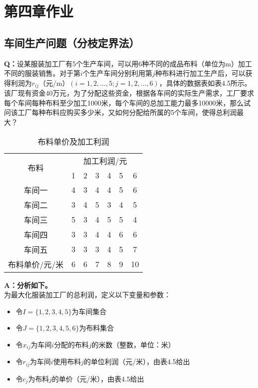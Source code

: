\ifx\allfiles\undefined

    
    
\else
\fi
\section{第四章作业}
\subsection{车间生产问题（分枝定界法）}
\textbf{Q：}设某服装加工厂有5个生产车间，可以用6种不同的成品布料（单位为m）加工不同的服装销售。对于第$i$个生产车间分别利用第$j$种布料进行加工生产后，可以获得利润为$r_{ij}$（元/m）$(i=1,2,...,5; j=1,2,...,6)$，具体的数据表如表4.5所示。\\
该厂现有资金40万元，为了分配这些资金，根据各车间的实际生产需求，工厂要求每个车间每种布料至少加工1000米，每个车间的总加工能力最多10000米，那么试问该工厂每种布料应购买多少米，又如何分配给所属的5个车间，使得总利润最大？

\begin{table}[ht]
\centering
\begin{tabular}{|c|c|c|c|c|c|c|}
\hline
\multirow{2}{*}{布料} & \multicolumn{6}{c|}{加工利润/元} \\ \cline{2-7} 
                      & 1 & 2 & 3 & 4 & 5 & 6 \\ \hline
车间一 & 4 & 3 & 4 & 4 & 5 & 6 \\ \hline
车间二 & 3 & 4 & 5 & 3 & 4 & 5 \\ \hline
车间三 & 5 & 3 & 4 & 5 & 5 & 4 \\ \hline
车间四 & 3 & 3 & 4 & 4 & 6 & 6 \\ \hline
车间五 & 3 & 3 & 3 & 4 & 5 & 7 \\ \hline
布料单价/元/米 & 6 & 6 & 7 & 8 & 9 & 10 \\ \hline
\end{tabular}
\caption{布料单价及加工利润}
\end{table}

\textbf{A：分析如下。}\\
为最大化服装加工厂的总利润，定义以下变量和参数：

\begin{itemize}
    \item 令$I = \{1, 2, 3, 4, 5\}$为车间集合
    \item 令$J = \{1, 2, 3, 4, 5, 6\}$为布料集合
    \item 令$x_{ij}$为车间$i$分配的布料$j$的米数（整数，单位：米）
    \item 令$r_{ij}$为车间$i$使用布料$j$的单位利润（元/米），由表4.5给出
    \item 令$c_j$为布料$j$的单价（元/米），由表4.5给出
\end{itemize}


